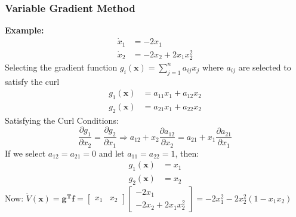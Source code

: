 \documentclass[11pt,handout]{beamer}   %
\begin{document}
\begin{frame}
\frametitle{Variable Gradient Method}
\small
\textbf{Example:}
\begin{equation*}
\begin{aligned}
\dot{x}_1 &= -2 x_1\\
\dot{x}_2 &= -2 x_2 + 2x_1 x_2 ^2
\end{aligned}
\end{equation*}
Selecting the gradient function $g_i(\mathbf{x}) = \sum_{j = 1}^{n} a_{ij} x_j$ where $a_{ij}$ are selected to satisfy the curl
\begin{equation*}
\begin{aligned}
g_1(\mathbf{x}) &= a_{11} x_1 + a_{12} x_2\\
g_2(\mathbf{x}) &= a_{21} x_1 + a_{22} x_2
\end{aligned}
\end{equation*}
Satisfying the Curl Conditions:
\begin{equation*}
\frac{\partial g_1}{\partial x_2} = \frac{\partial g_2}{\partial x_1} \Rightarrow a_{12} + x_2 \frac{\partial a_{12}}{\partial x_2} = a_{21} +  x_1 \frac{\partial a_{21}}{\partial x_1} 
\end{equation*}
If we select $a_{12} = a_{21} = 0$ and let $a_{11} = a_{22} = 1$, then:
\begin{equation*}
\begin{aligned}
g_1(\mathbf{x}) &= x_1\\
g_2(\mathbf{x}) &= x_2
\end{aligned}
\end{equation*}
Now: $\dot{V}(\mathbf{x}) = \mathbf{g^T f} = \begin{bmatrix}
x_1 & x_2
\end{bmatrix}
\begin{bmatrix}
-2 x_1 \\ -2 x_2 + 2 x_1 x_2^2
\end{bmatrix} = -2x_1^2 - 2x_2^2 (1-x_1x_2)$
\end{frame}
\end{document}
